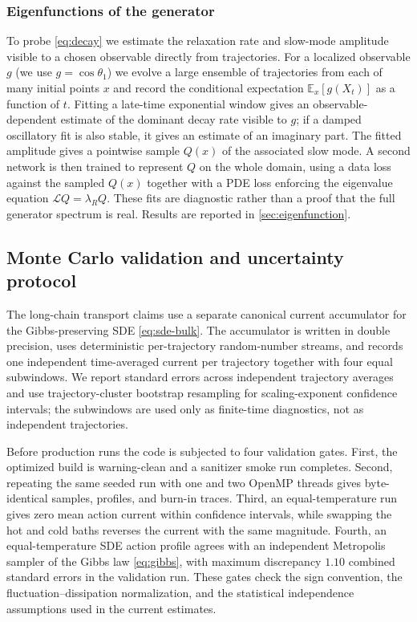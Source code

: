 \documentclass[11pt,a4paper]{article}
\theoremstyle{definition}
\newcommand{\E}{\mathbb{E}}
\numberwithin{equation}{section}   %
\newcommand{\Lgen}{\mathcal{L}}
\begin{document}
\subsubsection{Eigenfunctions of the generator}
To probe \eqref{eq:decay} we estimate the relaxation rate and slow-mode
amplitude visible to a chosen observable directly from trajectories. For a
localized observable $g$ (we use $g=\cos\theta_1$) we evolve a large ensemble
of trajectories from each of many initial points $x$ and record the conditional
expectation $\E_x[g(X_t)]$ as a function of $t$. Fitting a late-time
exponential window gives an
observable-dependent estimate of the dominant decay rate visible to $g$; if a
damped oscillatory fit is also stable, it gives an estimate of an imaginary
part. The fitted amplitude gives a pointwise sample $Q(x)$ of the associated
slow mode. A second network is then trained to represent $Q$ on the whole
domain, using a data loss against the sampled $Q(x)$ together with a PDE loss
enforcing the eigenvalue equation $\Lgen Q=\lambda_R Q$. These fits are
diagnostic rather than a proof that the full generator spectrum is real. Results
are reported in
\cref{sec:eigenfunction}.

\subsection{Monte Carlo validation and uncertainty protocol}\label{sec:mc-validation}

The long-chain transport claims use a separate canonical current accumulator
for the Gibbs-preserving SDE \eqref{eq:sde-bulk}. The accumulator is written in
double precision, uses deterministic per-trajectory random-number streams, and
records one independent time-averaged current per trajectory together with four
equal subwindows. We report standard errors across independent trajectory
averages and use trajectory-cluster bootstrap resampling for scaling-exponent
confidence intervals; the subwindows are used only as finite-time diagnostics,
not as independent trajectories.

Before production runs the code is subjected to four validation gates. First,
the optimized build is warning-clean and a sanitizer smoke run completes.
Second, repeating the same seeded run with one and two OpenMP threads gives
byte-identical samples, profiles, and burn-in traces. Third, an
equal-temperature run gives zero mean action current within confidence
intervals, while swapping the hot and cold baths reverses the current with the
same magnitude. Fourth, an equal-temperature SDE action profile agrees with an
independent Metropolis sampler of the Gibbs law \eqref{eq:gibbs}, with maximum
discrepancy $1.10$ combined standard errors in the validation run. These gates
check the sign convention, the fluctuation--dissipation normalization, and the
statistical independence assumptions used in the current estimates.
\end{document}
